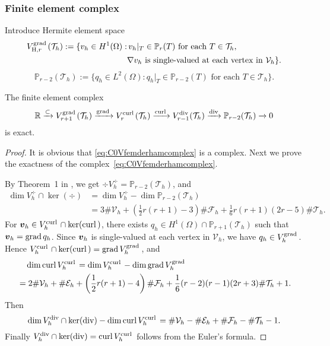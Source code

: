 \documentclass[10pt]{amsart}
\begin{document}
\subsubsection{Finite element complex}
Introduce Hermite element space
\begin{align*}
V_{{\rm H}, r}^{{\rm grad\,}}(\mathcal T_h):=\{v_h\in H^1(\Omega):&\, v_h|_T\in\mathbb P_{r}(T) \textrm{ for each } T\in\mathcal T_h, \\
&\nabla v_h \textrm{ is single-valued at each vertex in } \mathcal V_h \}.
\end{align*}
$$
\mathbb P_{r-2}(\mathcal T_h):=\{q_h\in L^2(\Omega): q_h|_T\in\mathbb P_{r-2}(T) \textrm{ for each } T\in\mathcal T_h\}.
$$
\begin{lemma}
The finite element complex
\begin{equation}\label{eq:C0Vfemderhamcomplex}
\mathbb R\xrightarrow{\subset} V_{r+1}^{{\rm grad\,}}(\mathcal T_h) \xrightarrow{{\rm grad\,}}V_r^{{\rm curl\,}}(\mathcal T_h) \xrightarrow{{\rm curl\,}} V_{r-1}^{\operatorname{div}}(\mathcal T_h)\xrightarrow{\operatorname{div}} \mathbb P_{r-2}(\mathcal T_h)\xrightarrow{}0
\end{equation}
is exact.
\end{lemma}
\begin{proof}
It is obvious that \eqref{eq:C0Vfemderhamcomplex} is a complex. Next we prove the exactness of the complex~\eqref{eq:C0Vfemderhamcomplex}.

By Theorem~1 in \cite{Stenberg2010},  we get $\div V_h^{\div}=\mathbb P_{r-2}(\mathcal T_h)$, and
\begin{align*}
\dim V_h^{\div}\cap\ker(\div)&=\dim V_h^{\div}-\dim \mathbb P_{r-2}(\mathcal T_h)\\
&=3\#\mathcal V_h+\left(\frac{1}{2}r(r+1)-3\right)\#\mathcal F_h+\frac{1}{6}r(r+1)(2r-5)\#\mathcal T_h.
\end{align*}
For $\boldsymbol v_h\in V_h^{{\rm curl\,}}\cap\ker({\rm curl\,})$, there exists $q_h\in H^1(\Omega)\cap \mathbb P_{r+1}(\mathcal T_h)$ such that $\boldsymbol v_h={\rm grad\,} q_h$.
Since $\boldsymbol v_h$ is single-valued at each vertex in $\mathcal V_h$, we have $q_h\in V_h^{{\rm grad\,}}$. Hence $V_h^{{\rm curl\,}}\cap\ker({\rm curl\,})={\rm grad\,} V_h^{{\rm grad\,}}$, and
\begin{align*}
&\quad\dim{\rm curl\,} V_h^{{\rm curl\,}}=\dim V_h^{{\rm curl\,}}-\dim{\rm grad\,} V_h^{{\rm grad\,}}\\
&=2\#\mathcal V_h+\#\mathcal E_h+\left(\frac{1}{2}r(r+1)-4\right)\#\mathcal F_h+\frac{1}{6}(r-2)(r-1)(2r+3)\#\mathcal T_h+1.
\end{align*}
Then
$$
\dim V_h^{\operatorname{div}}\cap\ker(\operatorname{div})-\dim{\rm curl\,} V_h^{{\rm curl\,}}=\#\mathcal V_h-\#\mathcal E_h+\#\mathcal F_h-\#\mathcal T_h-1.
$$
Finally $V_h^{\operatorname{div}}\cap\ker(\operatorname{div})={\rm curl\,} V_h^{{\rm curl\,}}$ follows from the Euler's formula.
\end{proof}




\end{document}
